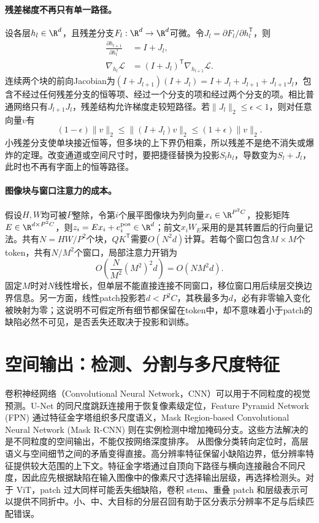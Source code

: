 \paragraph{残差梯度不再只有单一路径。}
设各层$h_l\in\R^d$，且残差分支$F_l:\R^d\to\R^d$可微。令$J_l=\partial F_l/\partial h_l^{\mathsf T}$，则
\begin{align}
 \frac{\partial h_{l+1}}{\partial h_l^{\mathsf T}}&=I+J_l,\\
 \nabla_{h_l}\mathcal L&=(I+J_l)^{\mathsf T}\nabla_{h_{l+1}}\mathcal L.
\end{align}
连续两个块的前向Jacobian为$(I+J_{l+1})(I+J_l)=I+J_l+J_{l+1}+J_{l+1}J_l$，包含不经过任何残差分支的恒等项、经过一个分支的项和经过两个分支的项。相比普通网络只有$J_{l+1}J_l$，残差结构允许梯度走较短路径。若$\|J_l\|_2\leq\epsilon<1$，则对任意向量$v$有
\begin{equation}
 (1-\epsilon)\|v\|_2\leq\|(I+J_l)v\|_2\leq(1+\epsilon)\|v\|_2.
\end{equation}
小残差分支使单块接近恒等，但多块的上下界仍相乘，所以残差不是绝不消失或爆炸的定理。改变通道或空间尺寸时，要把捷径替换为投影$S_lh_l$，导数变为$S_l+J_l$，此时也不再有字面上的恒等路径。

\paragraph{图像块与窗口注意力的成本。}
假设$H,W$均可被$P$整除，令第$i$个展平图像块为列向量$x_i\in\R^{P^2C}$，投影矩阵$E\in\R^{d\times P^2C}$，则$z_i=Ex_i+e_i^{\rm pos}\in\R^d$；前文$x_iW_E$采用的是其转置后的行向量记法。共有$N=HW/P^2$个块，$QK^{\mathsf T}$需要$O(N^2d)$计算。若每个窗口包含$M\times M$个token，共有$N/M^2$个窗口，局部注意力开销为
\begin{equation}
 O\left(\frac{N}{M^2}(M^2)^2d\right)=O(NM^2d).
\end{equation}
固定$M$时对$N$线性增长，但单层不能直接连接不同窗口，移位窗口用后续层交换边界信息。另一方面，线性patch投影若$d<P^2C$，其秩最多为$d$，必有非零输入变化被映射为零；这说明不可假定所有细节都保留在token中，却不意味着小于patch的缺陷必然不可见，是否丢失还取决于投影和训练。

\section{空间输出：检测、分割与多尺度特征}
卷积神经网络（Convolutional Neural Network，CNN）可以用于不同粒度的视觉预测。U-Net 的同尺度跳跃连接用于恢复像素级定位，Feature Pyramid Network (FPN) 通过特征金字塔组织多尺度语义，Mask Region-based Convolutional Neural Network (Mask R-CNN) 则在实例检测中增加掩码分支\cite{ronneberger2015unet,lin2017fpn,he2017mask}。这些方法解决的是不同粒度的空间输出，不能仅按网络深度排序。
从图像分类转向定位时，高层语义与空间细节之间的矛盾变得直接。高分辨率特征保留小缺陷边界，低分辨率特征提供较大范围的上下文。特征金字塔通过自顶向下路径与横向连接融合不同尺度，因此应先根据缺陷在输入图像中的像素尺寸选择输出层级，再选择检测头。对于 ViT，patch 过大同样可能丢失细缺陷，卷积 stem、重叠 patch 和层级表示可以提供不同折中。小、中、大目标的分层召回有助于区分表示分辨率不足与后续匹配错误。

